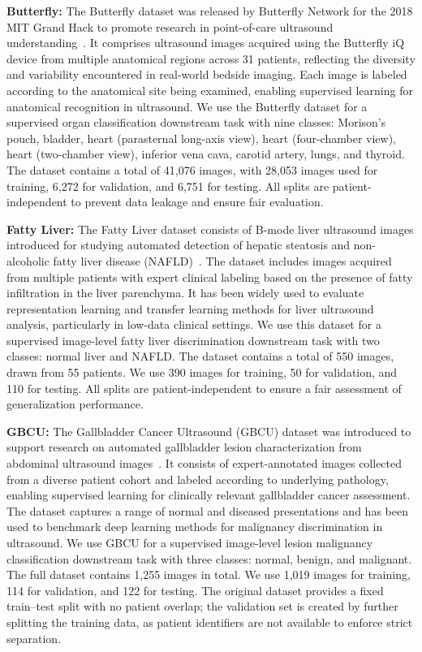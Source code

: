 \documentclass{article}
\theoremstyle{plain}
\theoremstyle{definition}
\theoremstyle{remark}
\begin{document}
\textbf{Butterfly:} The Butterfly dataset was released by Butterfly Network for the 2018 MIT Grand Hack to promote research in point-of-care ultrasound understanding~\cite{ButterflyNetwork}. It comprises ultrasound images acquired using the Butterfly iQ device from multiple anatomical regions across 31 patients, reflecting the diversity and variability encountered in real-world bedside imaging. Each image is labeled according to the anatomical site being examined, enabling supervised learning for anatomical recognition in ultrasound. We use the Butterfly dataset for a supervised organ classification downstream task with nine classes: Morison’s pouch, bladder, heart (parasternal long-axis view), heart (four-chamber view), heart (two-chamber view), inferior vena cava, carotid artery, lungs, and thyroid. The dataset contains a total of 41,076 images, with 28,053 images used for training, 6,272 for validation, and 6,751 for testing. All splits are patient-independent to prevent data leakage and ensure fair evaluation.

\textbf{Fatty Liver:} The Fatty Liver dataset consists of B-mode liver ultrasound images introduced for studying automated detection of hepatic steatosis and non-alcoholic fatty liver disease (NAFLD)~\cite{Byra2018TransferImages}. The dataset includes images acquired from multiple patients with expert clinical labeling based on the presence of fatty infiltration in the liver parenchyma. It has been widely used to evaluate representation learning and transfer learning methods for liver ultrasound analysis, particularly in low-data clinical settings. We use this dataset for a supervised image-level fatty liver discrimination downstream task with two classes: normal liver and NAFLD. The dataset contains a total of 550 images, drawn from 55 patients. We use 390 images for training, 50 for validation, and 110 for testing. All splits are patient-independent to ensure a fair assessment of generalization performance.

\textbf{GBCU:} The Gallbladder Cancer Ultrasound (GBCU) dataset was introduced to support research on automated gallbladder lesion characterization from abdominal ultrasound images~\cite{Basu2022SurpassingLearning}. It consists of expert-annotated images collected from a diverse patient cohort and labeled according to underlying pathology, enabling supervised learning for clinically relevant gallbladder cancer assessment. The dataset captures a range of normal and diseased presentations and has been used to benchmark deep learning methods for malignancy discrimination in ultrasound. We use GBCU for a supervised image-level lesion malignancy classification downstream task with three classes: normal, benign, and malignant. The full dataset contains 1,255 images in total. We use 1,019 images for training, 114 for validation, and 122 for testing. The original dataset provides a fixed train–test split with no patient overlap; the validation set is created by further splitting the training data, as patient identifiers are not available to enforce strict separation.
\end{document}
